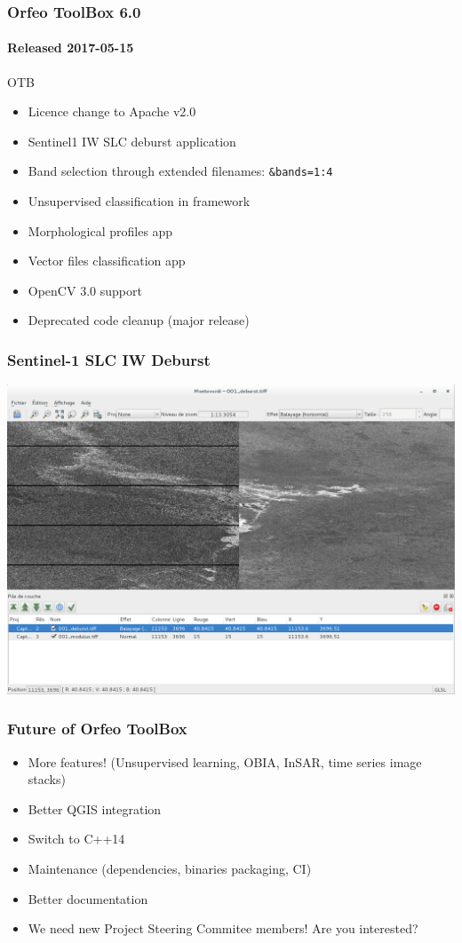 \documentclass[smaller]{beamer}
\begin{document}
\begin{frame}
\frametitle{Orfeo ToolBox 6.0}
\framesubtitle{Released 2017-05-15}
  \begin{block}{OTB}
    \begin{itemize}
      \item Licence change to  Apache v2.0
      \item Sentinel1 IW SLC deburst application
      \item Band selection through extended filenames: \texttt{\&bands=1:4}
      \item Unsupervised classification in framework
      \item Morphological profiles app
      \item Vector files classification app
      \item OpenCV 3.0 support
      \item Deprecated code cleanup (major release)
    \end{itemize}
    \end{block}
\end{frame}

\begin{frame}
\frametitle{Sentinel-1 SLC IW Deburst}
\includegraphics[width=1\textwidth]{images/monteverdi_S1_deburst.png}
\end{frame}

\begin{frame}
\frametitle{Future of Orfeo ToolBox}
\begin{itemize}
\item More features! (Unsupervised learning, OBIA, InSAR, time series image
    stacks)
\item Better QGIS integration
\item Switch to C++14
\item Maintenance (dependencies, binaries packaging, CI)
\item Better documentation
\item We need new Project Steering Commitee members! Are you interested?
\end{itemize}
\end{frame}
\end{document}
